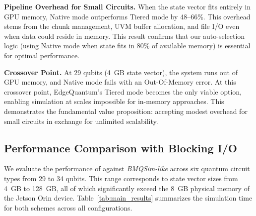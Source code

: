 \noindent\textbf{Pipeline Overhead for Small Circuits.}
When the state vector fits entirely in GPU memory, Native mode outperforms Tiered mode by 48--66\%.
This overhead stems from the chunk management, UVM buffer allocation, and file I/O even when data could reside in memory.
This result confirms that our auto-selection logic (using Native mode when state fits in 80\% of available memory) is essential for optimal performance.

\noindent\textbf{Crossover Point.}
At 29 qubits (4~GB state vector), the system runs out of GPU memory, and Native mode fails with an Out-Of-Memory error.
At this crossover point, EdgeQuantum's Tiered mode becomes the only viable option, enabling simulation at scales impossible for in-memory approaches.
This demonstrates the fundamental value proposition: accepting modest overhead for small circuits in exchange for unlimited scalability.


\subsection{Performance Comparison with Blocking I/O}
\label{sec:performance}

We evaluate the performance of \EdgeQuantum against \textit{BMQSim-like} across six quantum circuit types from 29 to 34 qubits.
This range corresponds to state vector sizes from 4~GB to 128~GB, all of which significantly exceed the 8~GB physical memory of the Jetson Orin device.
Table~\ref{tab:main_results} summarizes the simulation time for both schemes across all configurations.


